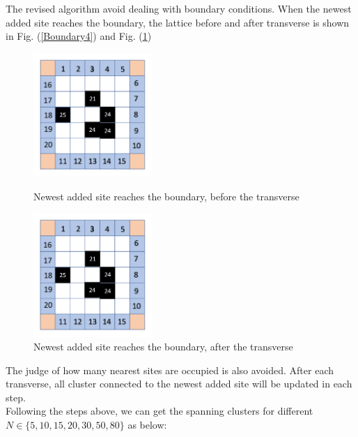 \documentclass[12pt]{article}
\begin{document}
The revised algorithm avoid dealing with boundary conditions. When the newest added site reaches the boundary, the lattice before and after transverse is shown in Fig. (\ref{Boundary4}) and Fig. (\ref{Boundary5})\\
\begin{figure}[h]
\centering
\includegraphics[width=0.4\textwidth]{Boundary4}
\caption{Newest added site reaches the boundary, before the transverse}
\label{Boundary4}
\includegraphics[width=0.4\textwidth]{Boundary5}
\caption{Newest added site reaches the boundary, after the transverse}
\label{Boundary5}
\end{figure}
The judge of how many nearest sites are occupied is also avoided. After each transverse, all cluster connected to the newest added site will be updated in each step. \\
Following the steps above, we can get the spanning clusters for different $N\in\{5, 10, 15, 20, 30, 50, 80\}$ as below:
\clearpage
\end{document}
